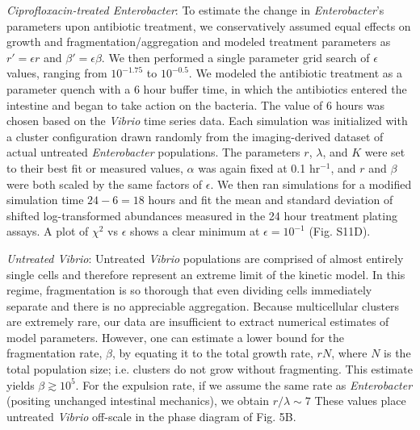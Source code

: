 \textit{Ciprofloxacin-treated Enterobacter}:  To estimate the change in \textit{Enterobacter}'s parameters upon antibiotic treatment, we conservatively assumed equal effects on growth and fragmentation/aggregation and modeled treatment parameters as $r' = \epsilon r$ and $\beta' = \epsilon \beta$. We then performed a single parameter grid search of $\epsilon$ values, ranging from $10^{-1.75}$ to $10^{-0.5}$. We modeled the antibiotic treatment as a parameter quench with a 6 hour buffer time, in which the antibiotics entered the intestine and began to take action on the bacteria. The value of 6 hours was chosen based on the \textit{Vibrio} time series data. Each simulation was initialized with a cluster configuration drawn randomly from the imaging-derived dataset of actual untreated \textit{Enterobacter} populations. The parameters $r$, $\lambda$, and $K$ were set to their best fit or measured values, $\alpha$ was again fixed at 0.1 hr$^{-1}$, and  $r$ and $\beta$ were both scaled by the same factors of $\epsilon$. We then ran simulations for a modified simulation time $24 - 6 = 18$ hours and fit the mean and standard deviation of shifted log-transformed abundances measured in the 24 hour treatment plating assays. A plot of $\chi^2$ vs $\epsilon$ shows a clear minimum at $\epsilon = 10^{-1}$ (Fig. S11D).

\textit{Untreated Vibrio}: Untreated \textit{Vibrio} populations are comprised of almost entirely single cells and therefore represent an extreme limit of the kinetic model. In this regime, fragmentation is so thorough that even dividing cells immediately separate and there is no appreciable aggregation. Because multicellular clusters are extremely rare, our data are insufficient to extract numerical estimates of model parameters. However, one can estimate a lower bound for the fragmentation rate, $\beta$, by equating it to the total growth rate, $rN$, where $N$ is the total population size; i.e. clusters do not grow without fragmenting. This estimate yields $\beta \gtrsim 10^5$. For the expulsion rate, if we assume the same rate as \textit{Enterobacter} (positing unchanged intestinal mechanics), we obtain $r/\lambda \sim 7$ These values place untreated \textit{Vibrio} off-scale in the phase diagram of Fig. 5B.

